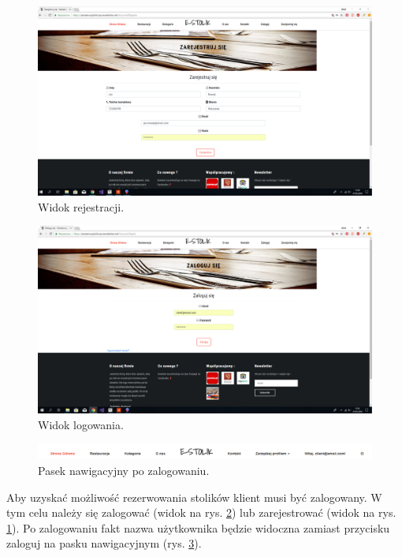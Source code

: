 \documentclass{article}
\begin{document}
\begin{figure}[H]
\centering
	\includegraphics[width=1.00\textwidth]{screens/register.png}
	\caption[caption]{Widok rejestracji.}
	\label{fig:register}
\end{figure}

\begin{figure}[H]
\centering
	\includegraphics[width=1.00\textwidth]{screens/login.png}
	\caption[caption]{Widok logowania.}
	\label{fig:login}
\end{figure}

\begin{figure}[H]
\centering
	\includegraphics[width=1.00\textwidth]{screens/loged_in.png}
	\caption[caption]{Pasek nawigacyjny po zalogowaniu.}
	\label{fig:loged_in}
\end{figure}

Aby uzyskać możliwość rezerwowania stolików klient musi być zalogowany. W tym celu należy się zalogować (widok na rys. \ref{fig:login}) lub zarejestrować (widok na rys. \ref{fig:register}). Po zalogowaniu fakt nazwa użytkownika będzie widoczna zamiast przycisku zaloguj na pasku nawigacyjnym (rys. \ref{fig:loged_in}).
\end{document}
